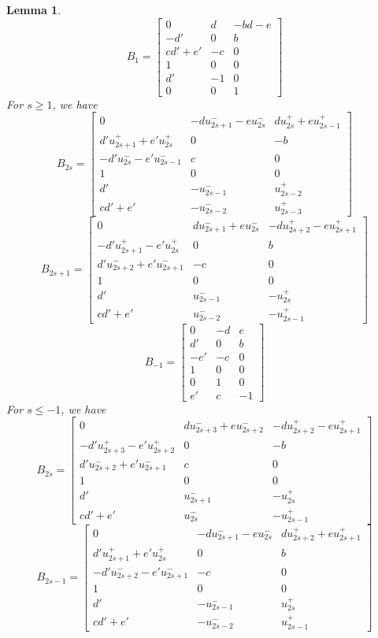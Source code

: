 \documentclass{amsart}
\newtheorem{lemma}[theorem]{Lemma}
\numberwithin{theorem}{section}
\begin{document}
  \begin{lemma}
    \[B_1=\left[\begin{array}{ccc} 0 & d & -bd-e \\ -d' & 0 & b\\ cd'+e' & -c & 0\\ 1 & 0 & 0\\ d' & -1 & 0\\ 0 & 0 & 1\end{array}\right]\]
    For $s\ge 1$, we have 
    \[B_{2s}=\left[\begin{array}{ccc} 0 & -du_{2s+1}^- - eu_{2s}^- & du_{2s}^+ + eu_{2s-1}^+ \\ d'u_{2s+1}^+ + e'u_{2s}^+ & 0 & -b\\ -d'u_{2s}^- - e'u_{2s-1}^- &  c & 0\\ 1 & 0 & 0\\ d' & -u_{2s-1}^- & u_{2s-2}^+ \\ cd'+e' & -u_{2s-2}^- & u_{2s-3}^+\end{array}\right]\]
    \[B_{2s+1}=\left[\begin{array}{ccc} 0 & du_{2s+1}^- + eu_{2s}^- & -du_{2s+2}^+ - eu_{2s+1}^+ \\ -d'u_{2s+1}^+ - e'u_{2s}^+ & 0 & b\\ d'u_{2s+2}^- + e'u_{2s+1}^- &  -c & 0\\ 1 & 0 & 0\\ d' & u_{2s-1}^- & -u_{2s}^+ \\ cd'+e' & u_{2s-2}^- & -u_{2s-1}^+\end{array}\right]\]
    \[B_{-1}=\left[\begin{array}{ccc} 0 & -d & e \\ d' & 0 & b\\ -e' & -c & 0\\ 1 & 0 & 0\\ 0 & 1 & 0\\ e' & c & -1\end{array}\right]\]
    For $s\le -1$, we have
    \[B_{2s}=\left[\begin{array}{ccc} 0 & du_{2s+3}^- + eu_{2s+2}^- & -du_{2s+2}^+ - eu_{2s+1}^+ \\ -d'u_{2s+3}^+ - e'u_{2s+2}^+ & 0 & -b\\ d'u_{2s+2}^- + e'u_{2s+1}^- &  c & 0\\ 1 & 0 & 0\\ d' & u_{2s+1}^- & -u_{2s}^+ \\ cd'+e' & u_{2s}^- & -u_{2s-1}^+\end{array}\right]\]
    \[B_{2s-1}=\left[\begin{array}{ccc} 0 & -du_{2s+1}^- - eu_{2s}^- & du_{2s+2}^+ + eu_{2s+1}^+ \\ d'u_{2s+1}^+ + e'u_{2s}^+ & 0 & b\\ -d'u_{2s+2}^- - e'u_{2s+1}^- &  -c & 0\\ 1 & 0 & 0\\ d' & -u_{2s-1}^- & u_{2s}^+ \\ cd'+e' & -u_{2s-2}^- & u_{2s-1}^+\end{array}\right]\]
  \end{lemma}
\end{document}
